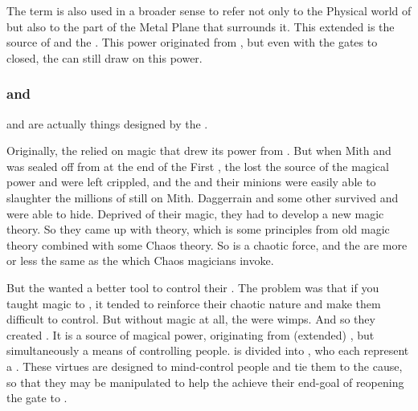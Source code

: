 The term \quo{\Nyx{}} is also used in a broader sense to refer not only to the Physical world of \Nyx{} but also to the part of the Metal Plane that surrounds it. This extended \Nyx{} is the source of \iquin{} and the \Sephiroth. This \nyxian{} power originated from \Erebos{}, but even with the gates to \Erebos{} closed, the \banes{} can still draw on this power. 

\subsubsection{\Iquin{} and \nieur{}}
\Iquin{} and \nieur{} are actually things designed by the \banes{}. 

Originally, the \banes{} relied on magic that drew its power from \Erebos{}. But when Mith and \Nyx{} was sealed off from \Erebos{} at the end of the First \Banewar, the \banes{} lost the source of the magical power and were left crippled, and the \dragons{} and their minions were easily able to slaughter the millions of \banes{} still on Mith. Daggerrain and some other \banelords{} survived and were able to hide. Deprived of their magic, they had to develop a new magic theory. So they came up with \nieur{} theory, which is some principles from old \bane{} magic theory combined with some Chaos theory. So \nieur{} is a chaotic force, and the \Kliffoth{} are more or less the same as the \daemons{} which Chaos magicians invoke. 

But the \banes{} wanted a better tool to control their \humans{}. The problem was that if you taught \nieur{} magic to \humans{}, it tended to reinforce their chaotic nature and make them difficult to control. But without magic at all, the \humans{} were wimps. And so they created \iquin{}. It is a source of magical power, originating from (extended) \Nyx{}, but simultaneously a means of controlling people. \Iquin{} is divided into \Sephiroth, who each represent a . These virtues are designed to mind-control people and tie them to the \banesz{} cause, so that they may be manipulated to help the \banes{} achieve their end-goal of reopening the gate to \Erebos{}. %

